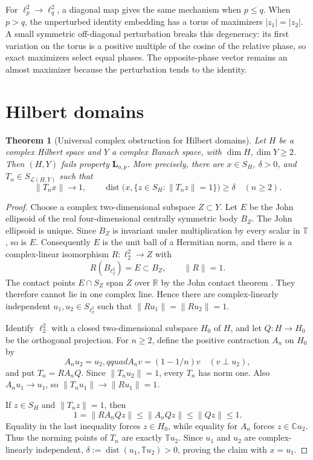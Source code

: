 \documentclass[11pt]{article}
\newtheorem{theorem}{Theorem}
\newcommand{\C}{\mathbb C}
\newcommand{\T}{\mathbb T}
\newcommand{\dist}{\operatorname{dist}}
\newcommand{\Lin}{\mathcal L}
\begin{document}
For $\ell_p^2\to\ell_q^2$, a diagonal map gives the same mechanism when
$p\le q$.  When $p>q$, the unperturbed identity embedding has a torus of
maximizers $|z_1|=|z_2|$.  A small symmetric off-diagonal perturbation breaks
this degeneracy: its first variation on the torus is a positive multiple of
the cosine of the relative phase, so exact maximizers select equal phases.
The opposite-phase vector remains an almost maximizer because the
perturbation tends to the identity.

\section{Hilbert domains}

\begin{theorem}[Universal complex obstruction for Hilbert domains]
\label{thm:hilbert}
Let $H$ be a complex Hilbert space and $Y$ a complex Banach space, with
$\dim H,\dim Y\ge2$.  Then $(H,Y)$ fails property $\mathbf L_{o,p}$.
More precisely, there are $x\in S_H$, $\delta>0$, and
$T_n\in S_{\Lin(H,Y)}$ such that
\[
 \|T_nx\|\longrightarrow1,
 \qquad
 \dist\bigl(x,\{z\in S_H:\|T_nz\|=1\}\bigr)\ge\delta
 \quad(n\ge2).
\]
\end{theorem}

\begin{proof}
Choose a complex two-dimensional subspace $Z\subset Y$.  Let $E$ be the
John ellipsoid of the real four-dimensional centrally symmetric body $B_Z$.
The John ellipsoid is unique.  Since $B_Z$ is invariant under multiplication
by every scalar in $\T$, so is $E$.  Consequently $E$ is the unit ball of a
Hermitian norm, and there is a complex-linear isomorphism
$R:\ell_2^2\to Z$ with
\[
 R(B_{\ell_2^2})=E\subset B_Z,
 \qquad \|R\|=1.
\]
The contact points $E\cap S_Z$ span $Z$ over $\mathbb R$ by the John
contact theorem \cite{John,Schneider}.  They therefore cannot lie in one
complex line.  Hence there are complex-linearly independent
$u_1,u_2\in S_{\ell_2^2}$ such that
$\|Ru_1\|=\|Ru_2\|=1$.

Identify $\ell_2^2$ with a closed two-dimensional subspace $H_0$ of $H$,
and let $Q:H\to H_0$ be the orthogonal projection.  For $n\ge2$, define the
positive contraction $A_n$ on $H_0$ by
\[
 A_nu_2=u_2,qquad
 A_nv=(1-1/n)v\quad(v\perp u_2),
\]
and put $T_n=RA_nQ$.  Since $\|T_nu_2\|=1$, every $T_n$ has norm one.  Also
$A_nu_1\to u_1$, so $\|T_nu_1\|\to\|Ru_1\|=1$.

If $z\in S_H$ and $\|T_nz\|=1$, then
\[
 1=\|RA_nQz\|\le\|A_nQz\|\le\|Qz\|\le1.
\]
Equality in the last inequality forces $z\in H_0$, while equality for
$A_n$ forces $z\in\C u_2$.  Thus the norming points of $T_n$ are exactly
$\T u_2$.  Since $u_1$ and $u_2$ are complex-linearly independent,
$\delta:=\dist(u_1,\T u_2)>0$, proving the claim with $x=u_1$.
\end{proof}
\end{document}
